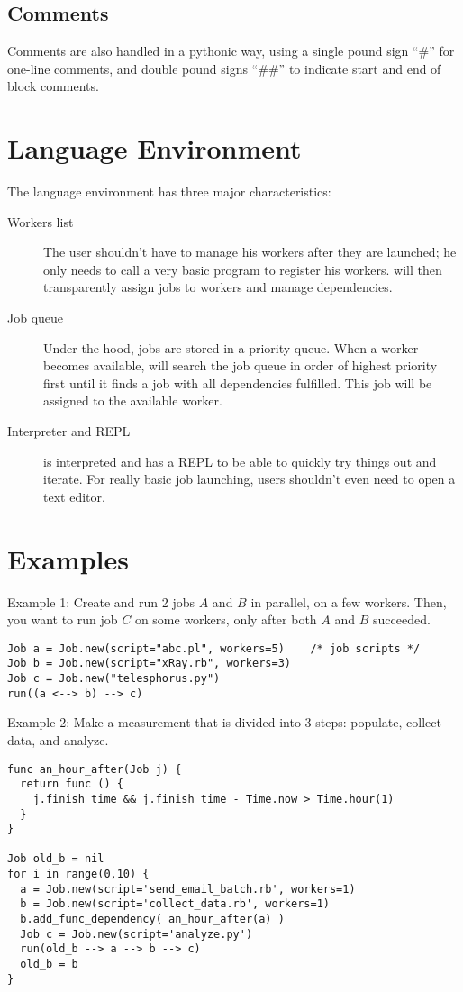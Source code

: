 \subsection*{Comments}
Comments are also handled in a pythonic way, using a single pound sign ``\#'' for
one-line comments, and double pound signs ``\#\#'' to indicate start and end of block comments.

%

\section{Language Environment}
\label{sect:tech}
The language environment has three major characteristics:
\begin{description}
\item[Workers list] The user shouldn't have to manage his workers after
they are launched; he only needs to call a very basic program
to register his workers. \lang{} will then transparently assign jobs to workers
and manage dependencies.
\item[Job queue] Under the hood, jobs are stored in a priority queue. When a
worker becomes available, \lang{} will search the job queue in order of highest
priority first until it finds a job with all dependencies fulfilled. This job
will be assigned to the available worker.
\item[Interpreter and REPL] \lang{} is interpreted and has a REPL to be able to
quickly try things out and iterate. For really basic job launching, users shouldn't
even need to open a text editor.
\end{description}

\section{Examples}
\label{sect:ex}
Example 1: Create and run 2 jobs $A$ and $B$ in parallel, on a few
workers. Then, you want to run job $C$ on some workers, only after both $A$
and $B$ succeeded.
\begin{lstlisting}
Job a = Job.new(script="abc.pl", workers=5)    /* job scripts */
Job b = Job.new(script="xRay.rb", workers=3)
Job c = Job.new("telesphorus.py")
run((a <--> b) --> c)
\end{lstlisting}
Example 2: Make a measurement that is divided into 3 steps: populate, collect
data, and analyze.
\begin{lstlisting}
func an_hour_after(Job j) {
  return func () {
    j.finish_time && j.finish_time - Time.now > Time.hour(1)
  }
}

Job old_b = nil
for i in range(0,10) {
  a = Job.new(script='send_email_batch.rb', workers=1)
  b = Job.new(script='collect_data.rb', workers=1)
  b.add_func_dependency( an_hour_after(a) )
  Job c = Job.new(script='analyze.py')
  run(old_b --> a --> b --> c)
  old_b = b
}
\end{lstlisting}

